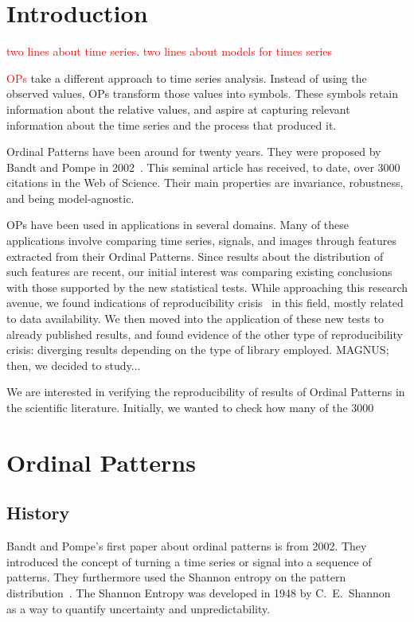 
\chapter{Introduction}

\textcolor{red}{two lines about time series}.
\textcolor{red}{two lines about models for times series}

\textcolor{red}{OPs} take a different approach to time series analysis.
Instead of using the observed values, OPs transform those values into symbols.
These symbols retain information about the relative values, and aspire at capturing relevant information about the time series and the process that produced it.

Ordinal Patterns have been around for twenty years.
They were proposed by Bandt and Pompe in 2002~\cite{Bandt2002}.
This seminal article has received, to date, over \num{3000} citations in the Web of Science.
Their main properties are invariance, robustness, and being model-agnostic.

OPs have been used in applications in several domains.
Many of these applications involve comparing time series, signals, and images through features extracted from their Ordinal Patterns.
Since results about the distribution of such features are recent, our initial interest was comparing existing conclusions with those supported by the new statistical tests.
While approaching this research avenue, we found indications of reproducibility crisis~\cite{Fidler2018} in this field, mostly related to data availability.
We then moved into the application of these new tests to already published results, and found evidence of the other type of reproducibility crisis: diverging results depending on the type of library employed.
MAGNUS; then, we decided to study...


We are interested in verifying the reproducibility of results of Ordinal Patterns in the scientific literature.
Initially, we wanted to check how many of the 3000

\chapter{Ordinal Patterns}

\section{History}
Bandt and Pompe's first paper about ordinal patterns is from 2002. 
They introduced the concept of turning a time series or signal into a sequence of patterns. 
They furthermore used the Shannon entropy on the pattern distribution~\cite{Bandt2002}. 
The Shannon Entropy was developed in 1948 by C.\ E.\ Shannon~\cite{Shannon1948} as a way to quantify uncertainty and unpredictability.

